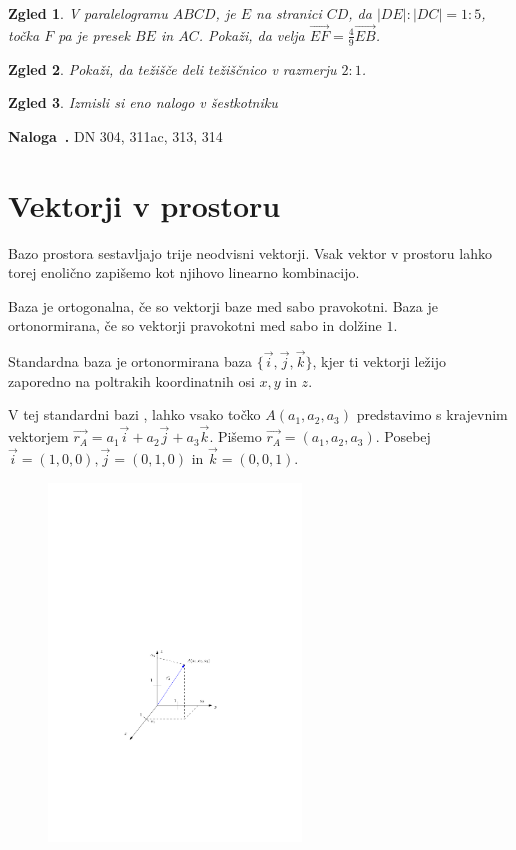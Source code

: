 \documentclass{article}
\newcounter{example}[section]
\newenvironment{example}[1][]{\refstepcounter{example}\par\medskip
   \noindent \textbf{Naloga~\theexample. #1} \rmfamily}{\medskip}
\newtheorem*{zgled}{Zgled}
\begin{document}
\begin{zgled}
    V paralelogramu $ABCD$, je $E$ na stranici $CD$, da $|DE|:|DC|=1:5$, točka $F$ pa je presek $BE$ in $AC$. Pokaži, da velja $\vec{EF}=\frac{4}{9}\vec{EB}$.
\end{zgled}

\begin{zgled}
    Pokaži, da težišče deli težiščnico v razmerju $2:1$.
\end{zgled}

\begin{zgled}
    Izmisli si eno nalogo v šestkotniku
\end{zgled}

\begin{example}
    DN 304, 311ac, 313, 314
\end{example}


\section{Vektorji v prostoru}

Bazo prostora sestavljajo trije neodvisni vektorji. Vsak vektor v prostoru lahko torej enolično zapišemo kot njihovo linearno kombinacijo.

Baza je ortogonalna, če so vektorji baze med sabo pravokotni. Baza je ortonormirana, če so vektorji pravokotni med sabo in dolžine $1$.

Standardna baza je ortonormirana baza $\{\vec{i},\vec{j},\vec{k}\}$, kjer ti vektorji ležijo zaporedno na poltrakih koordinatnih osi $x,y$ in $z$.

V tej standardni bazi , lahko vsako točko $A(a_1,a_2,a_3)$ predstavimo s krajevnim vektorjem $\vec{r_A}=a_1 \vec{i}+a_2\vec{j}+a_3\vec{k}$. Pišemo $\vec{r_A}=(a_1,a_2,a_3)$. Posebej $\vec{i}=(1,0,0) , \vec{j}=(0,1,0)$ in $\vec{k}=(0,0,1)$.

\begin{figure}[H]
\includegraphics[width=0.6\textwidth]{vektorji_slika.pdf}
\centering
\end{figure}
\end{document}
